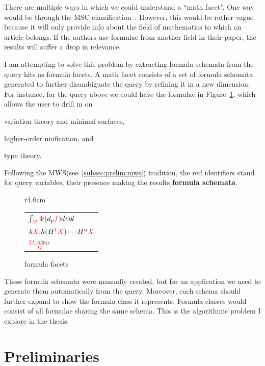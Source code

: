 \documentclass[a4paper,11pt,oneside]{article}
\def\red#1{\textcolor{red}{#1}}
\def\MWS{\textsf{MWS}\xspace}
\begin{document}
There are multiple ways in which we could understand a ``math facet''.  One way
would be through the MSC classification~\cite{MSC-SKOS}.  However, this would
be rather vague because it will only provide info about the field of
mathematics to which an article belongs. If the authors use formulae from
another field in their paper, the results will suffer a drop in relevance.

I am attempting to solve this problem by extracting formula schemata from the
query hits as formula facets. A math facet consists of a set of formula
schemata generated to further disambiguate the query by refining it in a new
dimension.  For instance, for the query above we could have the formulae in
Figure~\ref{fig:formula-facets}, which allows the user to drill in on
\begin{inparaenum}[\em i\rm)]
\item variation theory and minimal surfaces,
\item higher-order unification, and
\item type theory.
\end{inparaenum}
Following the \MWS (see~\ref{subsec:prelim:mws}) tradition, the red identifiers
stand for query variables, their presence making the results \textbf{formula
schemata}.

\begin{figure}r{4.6cm}\vspace*{-1em}
\begin{tabular}{l}
$\int_{\red{M}}{\red\Phi(d_p\red{f}) dvol}$\\[1ex]
$\lambda{\red{X}}.h(H^1\red{X})\cdots{H^n\red{X}}$\\[1ex]
$\frac{\red\Gamma\vdash\red{A}\gg\red\alpha}{\red{D}}$
\end{tabular}\vspace*{-.5em}
\caption{formula facets}\label{fig:formula-facets}\vspace*{-1em}
\end{figure}

These formula schemata were manually created, but for an application we need to
generate them automatically from the query. Moreover, each schema should
further expand to show the formula class it represents. Formula classes would
consist of all formulae sharing the same schema. This is the algorithmic
problem I explore in the thesis.


\section{Preliminaries}\label{sec:prelim}
\end{document}
